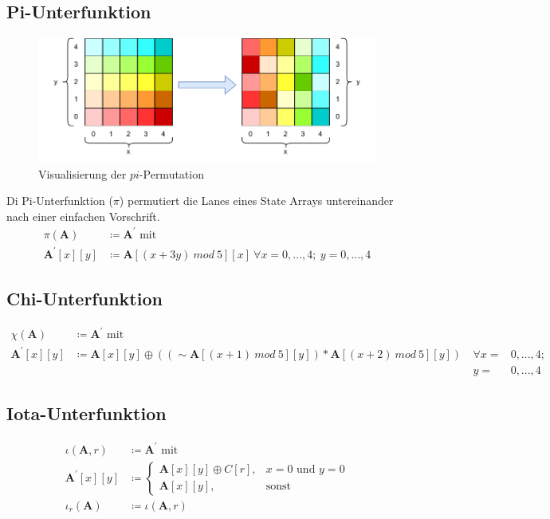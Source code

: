 \subsection{Pi-Unterfunktion}
\begin{figure}
    \center
    \includegraphics{images/pi.pdf}
    \caption{Visualisierung der $pi$-Permutation}
    \label{fig:definition_pi}
\end{figure}
Di Pi-Unterfunktion ($\pi$) permutiert die Lanes eines State Arrays untereinander nach einer einfachen Vorschrift.
\begin{align*}
    \pi (\textbf{A}) & \coloneq \textbf{A}^\prime \text{ mit } \\
    \textbf{A}^\prime[x][y] & \coloneq \textbf{A}[(x + 3y)\ mod\ 5][x]\ \forall x = 0,...,4;\ y = 0,...,4
\end{align*}

\subsection{Chi-Unterfunktion}

\begin{align*}
    \chi (\textbf{A}) & \coloneq \textbf{A}^\prime \text{ mit } \\
    \textbf{A}^\prime[x][y] & \coloneq \textbf{A}[x][y] \oplus ((\sim \textbf{A}[(x + 1)\ mod\ 5][y]) * \textbf{A}[(x + 2)\ mod\ 5][y])\ & \forall x = & 0,...,4;\\
    && y = & 0,...,4
\end{align*}

\subsection{Iota-Unterfunktion}

\begin{align*}
    \iota (\textbf{A}, r) & \coloneq \textbf{A}^\prime \text{ mit } \\
    \textbf{A}^\prime[x][y] & \coloneq
    \begin{cases}
        \textbf{A}[x][y] \oplus C[r], & x = 0 \text{ und } y = 0 \\
        \textbf{A}[x][y], & \text{sonst}
    \end{cases} \\
    \iota_r (\textbf{A}) & \coloneq \iota(\textbf{A}, r)
\end{align*}

